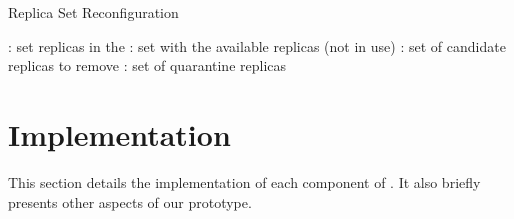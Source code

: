\begin{algorithm}[t]
\caption{Replica Set Reconfiguration}\label{alg:algorithm2}
{\footnotesize
\ES: set replicas in the \configuration \;
\RS: set with the available replicas (not in use)\;
\MAX: set of candidate replicas to remove\;
\QS: set of quarantine replicas\;

\BlankLine
{}
}
\end{algorithm}


\section{\system Implementation}
\label{sec:implementation}

This section details the implementation of each component of \system. 
It also briefly presents other aspects of our prototype.%


